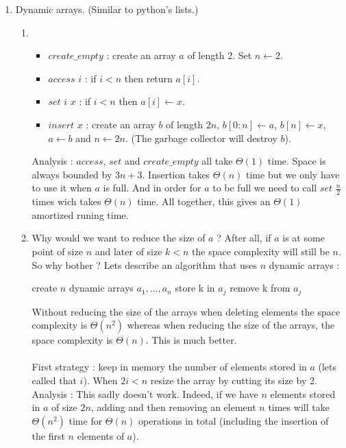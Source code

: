 \documentclass[12pt,4paper]{article}
\begin{document}
\begin{enumerate}
\item Dynamic arrays. (Similar to python's lists.)

\begin{enumerate}

\item

\begin{itemize}
\item $create\_empty$ : create an array $a$ of length 2. Set $n \leftarrow 2$.
\item $access$ $i$ : if $i < n$ then return $a[i]$.
\item $set$ $i$ $x$ : if $i < n$ then $a[i] \leftarrow x$.
\item $insert$ $x$ : create an
array $b$ of length $2 n$, $b[0:n] \leftarrow a$, $b[n] \leftarrow x$, $a
\leftarrow b$ and $n
\leftarrow 2n$. (The garbage collector will destroy $b$).
\end{itemize}

Analysis : $access$, $set$ and $create\_empty$ all take $\Theta(1)$ time. Space is always bounded by
$3n+3$. Insertion takes $\Theta(n)$ time but we only have to use it when $a$ is
full. And in order for $a$ to be full we need to call $set$ $\frac{n}{2}$ times wich
takes $\Theta(n)$ time. All together, this gives an $\Theta(1)$ amortized
runing time.

\item Why would we want to reduce the size of $a$ ? After all, if $a$ is at
some point of size $n$ and later of size $k < n$ the space complexity will
still be
$n$. So why bother ? Lets describe an algorithm that uses $n$ dynamic
arrays :\\

\begin{algorithm}[H]
\DontPrintSemicolon
create $n$ dynamic arrays $a_1, \dots, a_n$\;
 {
     {
        store k in $a_j$\;
    }
     {
        remove k from $a_j$\;
    }
}
\;
\end{algorithm}

Without reducing the size of the arrays when deleting elements the space
complexity is $\Theta(n^2)$ whereas when reducing the size of the arrays, the
space complexity is $\Theta(n)$.
This is much better.\\\\
First strategy : keep in memory the number of elements stored in $a$ (lets called that
$i$). When $2i<n$ resize the array by cutting its size by 2.\\
Analysis : This sadly doesn't work. Indeed, if we have $n$ elements stored in
$a$ of size $2n$, adding and then removing an element $n$ times will take
$\Theta(n^2)$ time for $\Theta(n)$ operations in total (including the insertion of
the first $n$ elements of $a$).


\end{enumerate}
\end{enumerate}
\end{document}
